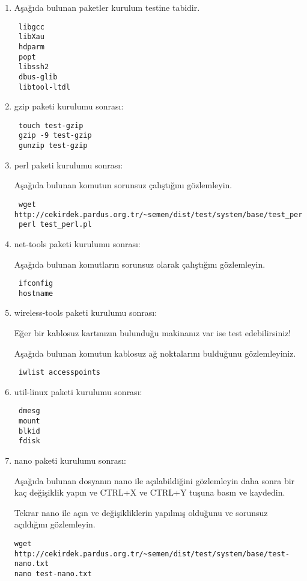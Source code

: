 \documentclass[a4paper,10pt]{article}
\begin{document}
\begin{enumerate}
\item Aşağıda bulunan paketler kurulum testine tabidir.
\begin{verbatim}
 libgcc
 libXau
 hdparm
 popt
 libssh2
 dbus-glib 
 libtool-ltdl 
\end{verbatim}

\item gzip paketi kurulumu sonrası:
\begin{verbatim}
 touch test-gzip
 gzip -9 test-gzip
 gunzip test-gzip 
\end{verbatim}


\item perl paketi kurulumu sonrası:

Aşağıda bulunan komutun sorunsuz çalıştığını gözlemleyin.
\begin{verbatim}
 wget http://cekirdek.pardus.org.tr/~semen/dist/test/system/base/test_perl.pl
 perl test_perl.pl
\end{verbatim}

\item net-tools paketi kurulumu sonrası:

Aşağıda bulunan komutların sorunsuz olarak çalıştığını gözlemleyin.
\begin{verbatim}
 ifconfig
 hostname
\end{verbatim}


\item wireless-tools paketi kurulumu sonrası:

Eğer bir kablosuz kartınızın bulunduğu makinanız var ise test edebilirsiniz!

Aşağıda bulunan komutun kablosuz ağ noktalarını bulduğunu gözlemleyiniz.
\begin{verbatim}
 iwlist accesspoints
\end{verbatim}


\item util-linux paketi kurulumu sonrası:
\begin{verbatim}
 dmesg
 mount 
 blkid
 fdisk
\end{verbatim}

\item nano paketi kurulumu sonrası:

Aşağıda bulunan dosyanın nano ile açılabildiğini gözlemleyin daha sonra bir kaç değişiklik yapın ve CTRL+X ve CTRL+Y tuşuna basın ve kaydedin. 

Tekrar nano ile açın ve değişikliklerin yapılmış olduğunu ve sorunsuz açıldığını gözlemleyin.
\begin{verbatim}
wget http://cekirdek.pardus.org.tr/~semen/dist/test/system/base/test-nano.txt 
nano test-nano.txt
\end{verbatim}



\end{enumerate}
\end{document}
